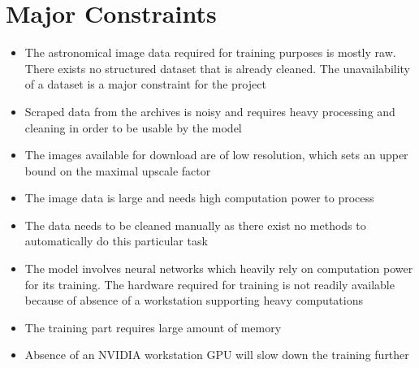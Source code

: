 \documentclass[oneside,a4paper,12pt]{report}
\begin{document}
\section{Major Constraints}
\begin{itemize}
\item The astronomical image data required for training purposes is mostly raw. There exists no structured dataset that is already cleaned. The unavailability of a dataset is a major constraint for the project
\item Scraped data from the archives is noisy and requires heavy processing and cleaning in order to be usable by the model
\item The images available for download are of low resolution, which sets an upper bound on the maximal upscale factor
\item The image data is large and needs high computation power to process
\item The data needs to be cleaned manually as there exist no methods to automatically do this particular task
\item The model involves neural networks which heavily rely on computation power for its training. The hardware required for training is not readily available because of absence of a workstation supporting heavy computations
\item The training part requires large amount of memory
\item Absence of an NVIDIA workstation GPU will slow down the training further
\end{itemize}
\end{document}
